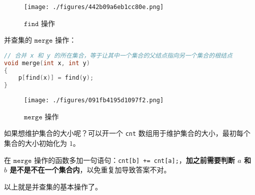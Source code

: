 \begin{figure}[ht]
\centering
\texttt{[image: ./figures/442b09a6eb1cc80e.png]}
\caption{$\mathtt{find}$ 操作} \label{fig_DSU_1}
\end{figure}

并查集的 $\mathtt{merge}$ 操作：
\begin{lstlisting}[language=cpp]
// 合并 x 和 y 的所在集合，等于让其中一个集合的父结点指向另一个集合的根结点
void merge(int x, int y)
{
    p[find(x)] = find(y);
}
\end{lstlisting}


\begin{figure}[ht]
\centering
\texttt{[image: ./figures/091fb4195d1097f2.png]}
\caption{$\mathtt{merge}$ 操作} \label{fig_DSU_2}
\end{figure}

如果想维护集合的大小呢？可以开一个 \verb`cnt` 数组用于维护集合的大小，最初每个集合的大小初始化为 $1$。

在 $\mathtt{merge}$ 操作的函数多加一句语句：\verb`cnt[b] += cnt[a];`，\textbf{加之前需要判断 $a$ 和 $b$ 是不是不在一个集合内}，以免重复加导致答案不对。


以上就是并查集的基本操作了。

